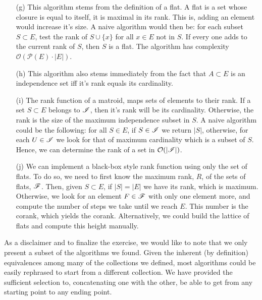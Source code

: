 \begin{itemize}
    \item[(g)] This algorithm stems from the definition of a flat. A flat is a set whose closure is equal to itself, it is maximal in its rank. This is, adding an element would increase it's size. A naive algorithm would then be: for each subset  $S \subset E$, test the rank of $S \cup \{x \}$ for all $x \in E$ not in $S$. If every one adds to the current rank of $S$, then $S$ is a flat. The algorithm has complexity $\mathcal{O}(\mathcal{P}(E) \cdot |E|)$.
    \item[(h)] This algorithm also stems immediately from the fact that $A \subset E$ is an independence set iff it's rank equals its cardinality.
    \item[(i)] The rank function of a matroid, maps sets of elements to their rank. If a set $S \subset E$ belongs to $\mathscr{I}$, then it's rank will be its cardinality. Otherwise, the rank is the size of the maximum independence subset in $S$. A naive algorithm could be the following: for all $S \in E$, if $S \in \mathscr{I}$ we return $|S|$, otherwise, for each $U \in \mathscr{I}$ we look for that of maximum cardinality which is a subset of $S$. Hence, we can determine the rank of a set in $\mathcal{O}(|\mathscr{I}|)$.
    \item[(j)] We can implement a black-box style rank function using only the set of flats. To do so, we need to first know the maximum rank, $R$, of the sets of flats, $\mathscr{F}$. Then, given $S \subset E$, if $|S| = |E|$ we have its rank, which is maximum. Otherwise, we look for an element $F \in \mathscr{F}$ with only one element more, and compute the number of steps we take until we reach $E$. This number is the corank, which yields the corank. Alternatively, we could build the lattice of flats and compute this height manually.  
\end{itemize}

As a disclaimer and to finalize the exercise, we would like to note that we only present a subset of the algorithms we found.
Given the inherent (by definition) equivalences among many of the collections we defined, most algorithms could be easily rephrased to start from a different collection.
We have provided the sufficient selection to, concatenating one with the other, be able to get from any starting point to any ending point.
